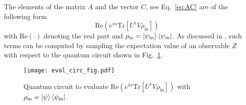 \documentclass[twocolumn, aps, pra, superscriptaddress, floatfix]{revtex4}
\begin{document}
The elements of the matrix $A$ and the vector $C$, see Eq.~\eqref{eq:AC} are of the following form
\begin{equation}
\label{eq:expValueEval}
	\text{Re}\left(e^{i\alpha}\text{Tr}\left[U^{\dagger}V\rho_{\text{in}}\right]\right)
\end{equation}
with $\text{Re}\left(\cdot\right)$ denoting the real part and $\rho_{\text{in}} = \ket{\psi_{\text{in}}}\bra{\psi_{\text{in}}}$.
As discussed in \cite{VarSITEMcArdle19, Simon18TheoryVarQSim, LaflammeSimulatingPhysPhenom02}, such terms can be computed by sampling the expectation value of an observable $Z$ with respect to the quantum circuit shown in Fig.~\ref{fig:expValueCircuit}.

\begin{figure}[h!]
\captionsetup{singlelinecheck = false, format= hang, justification=raggedright, font=footnotesize, labelsep=space}
\begin{center}
\texttt{[image: eval\_circ\_fig.pdf]}
\end{center}
\caption{Quantum circuit to evaluate $\text{Re}\left(e^{i\alpha}\text{Tr}\left[U^{\dagger}V\rho_{\text{in}}\right]\right)$ with $\rho_{\text{in}} = \ket{\psi}\bra{\psi_{\text{in}}}$.}
\label{fig:expValueCircuit}
\end{figure}
\end{document}
